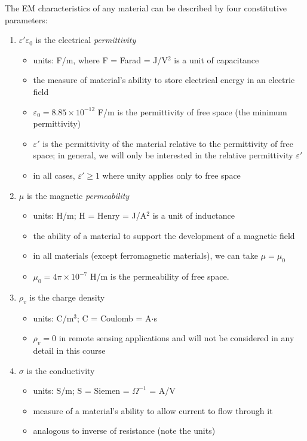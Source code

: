 \documentclass[11pt, oneside]{article}
\begin{document}
The EM characteristics of any material can be described by four constitutive parameters:
\begin{enumerate}
	\item $\varepsilon'\varepsilon_0 $ is the electrical \emph{permittivity} 
	\begin{itemize}
		\item units: F/m, where F = Farad = J/V$^2$ is a unit of capacitance
		\item the measure of material's ability to store electrical energy in an electric field
		\item $\varepsilon_0 = 8.85\times10^{-12}$ F/m is the permittivity of free space (the minimum permittivity)
		\item $\varepsilon'$ is the permittivity of the material relative to the permittivity of free space; in general, we will only be interested in the relative permittivity $\varepsilon'$
		\item in all cases, $\varepsilon' \ge 1$ where unity applies only to free space
	\end{itemize}
	\item $\mu$ is the magnetic \emph{permeability} 
	\begin{itemize}
		\item units: H/m; H = Henry = J/A$^2$ is a unit of inductance
		\item the ability of a material to support the development of a magnetic field
		\item in all materials (except ferromagnetic materials), we can take $\mu = \mu_0$
		\item $\mu_0 = 4\pi\times10^{-7}$ H/m is the permeability of free space.
	\end{itemize}
	\item $\rho_v$ is the charge density 
	\begin{itemize}
	 	\item units: C/m$^3$; C = Coulomb = A$\cdot$s
		\item $\rho_v = 0$ in remote sensing applications and will not be considered in any detail in this course
	\end{itemize}
	\item $\sigma$ is the conductivity 
	\begin{itemize}
		\item units: S/m; S = Siemen = $\Omega^{-1}$ = A/V
		\item measure of a material's ability to allow current to flow through it
		\item analogous to inverse of resistance (note the units)

\end{itemize}
\end{enumerate}
\end{document}
